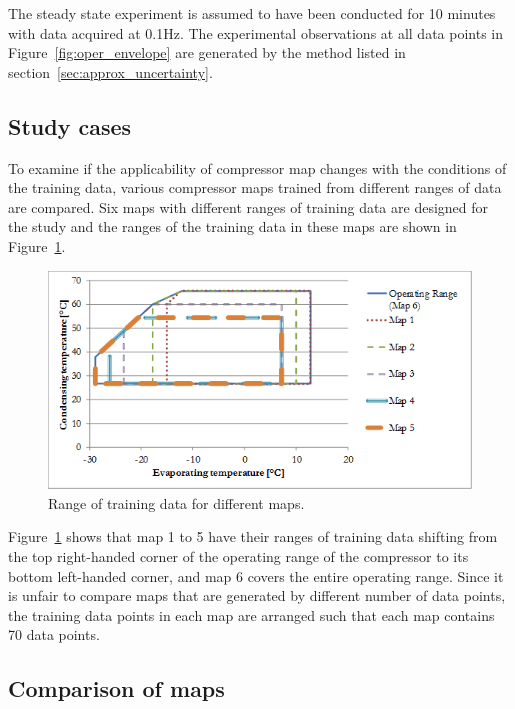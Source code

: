 The steady state experiment is assumed to have been conducted for 10 minutes with data acquired at 0.1Hz. The experimental observations at all data points in Figure~\ref{fig:oper_envelope} are generated by the method listed in section~\ref{sec:approx_uncertainty}.\\

\subsection{Study cases}
\label{sec:study_cases}

To examine if the applicability of compressor map changes with the conditions of the training data, various compressor maps trained from different ranges of data are compared. Six maps with different ranges of training data are designed for the study and the ranges of the training data in these maps are shown in Figure~\ref{fig:training_envelope}.


\begin{figure}[h]
\includegraphics[width=0.7\linewidth]{./fig/training_data_sets.png}\hspace{0.05\linewidth}%
\begin{minipage}[b]{0.25\linewidth}\caption{\label{fig:training_envelope} Range of training data for different maps.}
\end{minipage}
\end{figure}

Figure~\ref{fig:training_envelope} shows that map 1 to 5 have their ranges of training data shifting from the top right-handed corner of the operating range of the compressor to its bottom left-handed corner, and map 6 covers the entire operating range. Since it is unfair to compare maps that are generated by different number of data points, the training data points in each map are arranged such that each map contains 70 data points.

\subsection{Comparison of maps}
